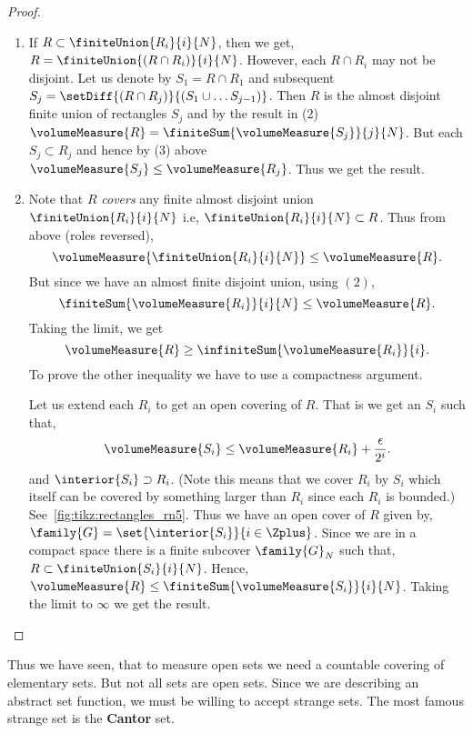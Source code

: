 \begin{proof}
\begin{enumerate}
	    monotonicity. Here we will give a different proof. 
	    If $R\subset S$, then extend the sides of $R$ to intersect the sides of $S$. Then using the result
	    above $\volumeMeasure{S}$ is the sum of almost disjoint rectangles $\lbrace R_i\rbrace$, 
	    where one of $R_i$ is equal to $R$. See~\ref{fig:tikz:rectangles_rn3}.
	    Hence we get the result.
	\item
	    If $R \subset \finiteUnion{R_i}{i}{N}$, then we get,
	    $R = \finiteUnion{(R\cap R_i)}{i}{N}$. However, each $R\cap R_i$ may not be disjoint. Let us
	    denote by $S_1 = R\cap R_1$ and subsequent $S_j = \setDiff{(R\cap R_j)}{(S_1\cup\dots S_{j-1})}$.
	    Then $R$ is the almost disjoint finite union of rectangles $S_j$ and by the result in (2)
	    $\volumeMeasure{R} = \finiteSum{\volumeMeasure{S_j}}{j}{N}$. But each $S_j \subset R_j$ and hence
	    by (3) above
	    $\volumeMeasure{S_j} \leq \volumeMeasure{R_j}$. Thus we get the result.
	\item
	    Note that $R$ \emph{covers} any finite almost disjoint union $\finiteUnion{R_i}{i}{N}$ i.e,
	    $\finiteUnion{R_i}{i}{N} \subset R$. Thus from above (roles reversed),
	    \[\volumeMeasure{\finiteUnion{R_i}{i}{N}} \leq \volumeMeasure{R}.\]
	    But since we have an almost finite disjoint union, using $(2)$,
	    \[\finiteSum{\volumeMeasure{R_i}}{i}{N} \leq \volumeMeasure{R}.\]
	    Taking the limit, we get
	    \[\volumeMeasure{R} \geq \infiniteSum{\volumeMeasure{R_i}}{i}.\]
	    To prove the other inequality we have to use a compactness argument.

	    Let us extend each ${R_i}$ to get an open covering of $R$. That is we get an
	    $S_i$ such that,
	    \[ \volumeMeasure{S_i} \leq \volumeMeasure{R_i} + \frac{\epsilon}{2^i}.\]
	    and $\interior{S_i} \supset R_i$.
	    (Note this means that we cover $R_i$ by $S_i$ which itself can be covered by something
	    larger than $R_i$ since each $R_i$ is bounded.) See~\ref{fig:tikz:rectangles_rn5}.
	    Thus we have an open cover of $R$ given by, 
	    $\family{G} = \set{\interior{S_i}}{i\in\Zplus}$. Since we are in a compact space there
	    is a finite subcover $\family{G}_{N}$ such that,
	    $R \subset \finiteUnion{S_i}{i}{N}$. Hence,
	    $\volumeMeasure{R} \leq \finiteSum{\volumeMeasure{S_i}}{i}{N}$. 
	    Taking the limit to $\infty$ we get the result.
    \end{enumerate}
\end{proof}

Thus we have seen, that to measure open sets we need a countable covering of elementary sets. But not all sets
are open sets. Since we are describing an abstract set function, we must be willing to accept strange sets.
The most famous strange set is the \textbf{Cantor} set.

